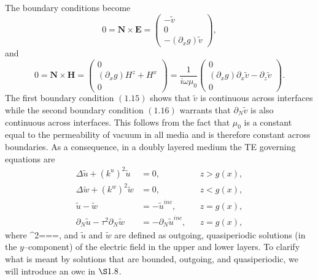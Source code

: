 The boundary conditions become
\begin{equation}
0=\textbf{N} \times \textbf{E} = \begin{pmatrix}
-\tilde{v} \\ 0 \\ -(\partial_x g)\tilde{v}
\end{pmatrix},
\end{equation}
and
\begin{equation}
0=\textbf{N} \times \textbf{H} = \begin{pmatrix}
0 \\ (\partial_x g)H^z + H^x \\ 0 
\end{pmatrix}=\frac{1}{i\omega\mu_0}\begin{pmatrix}
0 \\ (\partial_x g)\partial_x \tilde{v} - \partial_z \tilde{v} \\ 0
\end{pmatrix}.
\end{equation}
The first boundary condition $(1.15)$ shows that $\tilde{v}$ is continuous across interfaces while the second boundary condition $(1.16)$ warrants that $\partial_N \tilde{v}$ is also continuous across interfaces. This follows from the fact that $\mu_0$ is a constant equal to the permeability of vacuum in all media and is therefore constant across boundaries. As a consequence, in a doubly layered medium the TE governing equations are
\begin{subequations}
\begin{align}
\Delta \tilde{u} + (k^u)^2 \tilde{u} &=0,&& z > g(x),\\
\Delta \tilde{w} + (k^w)^2 \tilde{w} &=0,&& z < g(x),\\
\tilde{u}-\tilde{w} &= -\tilde{u}^{inc},&& z=g(x),\\
\partial_N \tilde{u}-\tau^2\partial_N \tilde{w} &= -\partial_N \tilde{u}^{inc},&& z=g(x),
\end{align}
\end{subequations}
where
\bes
\tau^2===,
\ees
and $\tilde{u}$ and $\tilde{w}$ are defined as outgoing, quasiperiodic solutions (in the $y$--component) of the electric field in the upper and lower layers. To clarify what is meant by solutions that are bounded, outgoing, and quasiperiodic, we will introduce an \gls{owc} in $\S 1.8$.